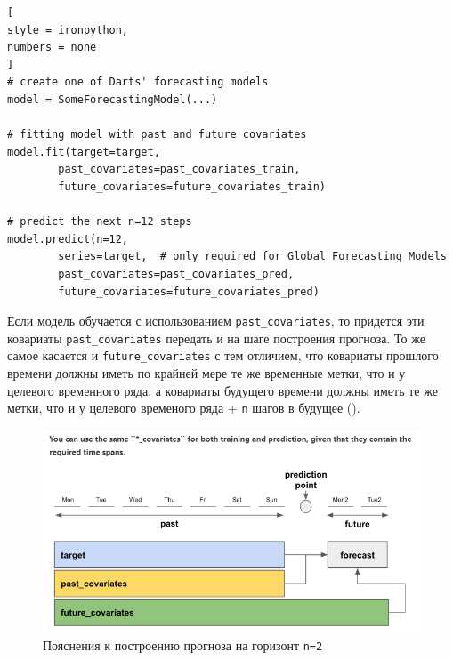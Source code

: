 \documentclass[%
	11pt,
	a4paper,
	utf8,
		]{article}
\begin{document}
\begin{lstlisting}[
style = ironpython,
numbers = none
]
# create one of Darts' forecasting models
model = SomeForecastingModel(...)

# fitting model with past and future covariates
model.fit(target=target,
		past_covariates=past_covariates_train,
		future_covariates=future_covariates_train)

# predict the next n=12 steps
model.predict(n=12,
		series=target,  # only required for Global Forecasting Models
		past_covariates=past_covariates_pred,
		future_covariates=future_covariates_pred)
\end{lstlisting}

Если модель обучается с использованием \verb|past_covariates|, то придется эти ковариаты \verb|past_covariates| передать и на шаге построения прогноза. То же самое касается и \verb|future_covariates| с тем отличием, что ковариаты прошлого времени должны иметь по крайней мере те же временные метки, что и у целевого временного ряда, а ковариаты будущего времени должны иметь те же метки, что и у целевого временого ряда + \verb|n| шагов в будущее ().

\begin{figure}[h]
	\centering
	\includegraphics[scale=0.9 ]{figures/past_future_covariates.png}
	\caption{ Пояснения к построению прогноза на горизонт \texttt{n=2} }\label{fig:past_future_covariates}
\end{figure}
\end{document}
